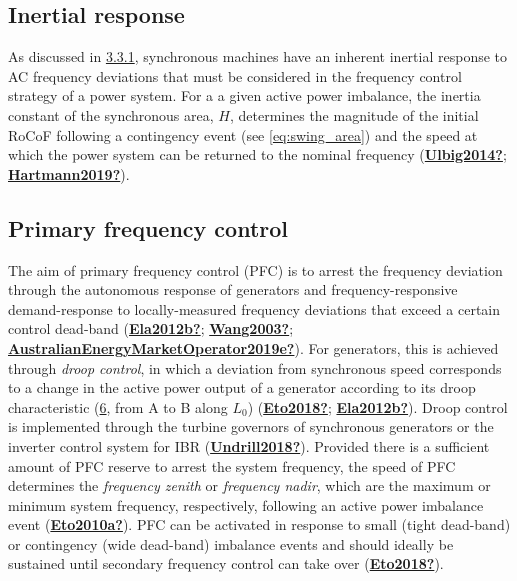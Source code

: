 \documentclass[12pt,a4paper,]{report}
\begin{document}
\hypertarget{inertial-response}{%
\subsection{Inertial response}\label{inertial-response}}

As discussed in \protect\hyperlink{sec:electromech}{3.3.1}, synchronous
machines have an inherent inertial response to AC frequency deviations
that must be considered in the frequency control strategy of a power
system. For a a given active power imbalance, the inertia constant of
the synchronous area, \(H\), determines the magnitude of the initial
RoCoF following a contingency event (see
\protect\hyperlink{eq:swing_area}{{[}eq:swing\_area{]}}) and the speed
at which the power system can be returned to the nominal frequency
(\protect\hyperlink{ref-Ulbig2014}{\textbf{Ulbig2014?}};
\protect\hyperlink{ref-Hartmann2019}{\textbf{Hartmann2019?}}).

\hypertarget{primary-frequency-control}{%
\subsection{Primary frequency control}\label{primary-frequency-control}}

The aim of primary frequency control (PFC) is to arrest the frequency
deviation through the autonomous response of generators and
frequency-responsive demand-response to locally-measured frequency
deviations that exceed a certain control dead-band
(\protect\hyperlink{ref-Ela2012b}{\textbf{Ela2012b?}};
\protect\hyperlink{ref-Wang2003}{\textbf{Wang2003?}};
\protect\hyperlink{ref-AustralianEnergyMarketOperator2019e}{\textbf{AustralianEnergyMarketOperator2019e?}}).
For generators, this is achieved through \emph{droop control}, in which
a deviation from synchronous speed corresponds to a change in the active
power output of a generator according to its droop characteristic
(\protect\hyperlink{fig:droop}{6}, from A to B along \(L_0\))
(\protect\hyperlink{ref-Eto2018}{\textbf{Eto2018?}};
\protect\hyperlink{ref-Ela2012b}{\textbf{Ela2012b?}}). Droop control is
implemented through the turbine governors of synchronous generators or
the inverter control system for IBR
(\protect\hyperlink{ref-Undrill2018}{\textbf{Undrill2018?}}). Provided
there is a sufficient amount of PFC reserve to arrest the system
frequency, the speed of PFC determines the \emph{frequency zenith} or
\emph{frequency nadir}, which are the maximum or minimum system
frequency, respectively, following an active power imbalance event
(\protect\hyperlink{ref-Eto2010a}{\textbf{Eto2010a?}}). PFC can be
activated in response to small (tight dead-band) or contingency (wide
dead-band) imbalance events and should ideally be sustained until
secondary frequency control can take over
(\protect\hyperlink{ref-Eto2018}{\textbf{Eto2018?}}).
\end{document}
